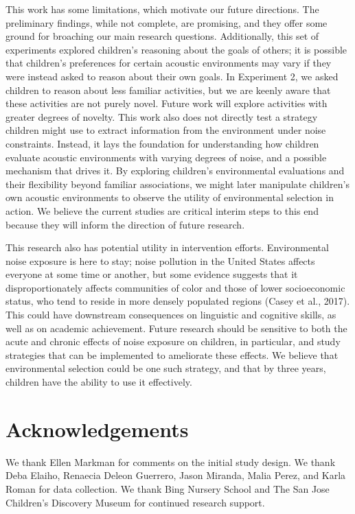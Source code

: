 \documentclass[10pt, letterpaper]{article}
\begin{document}
This work has some limitations, which motivate our future directions.
The preliminary findings, while not complete, are promising, and they
offer some ground for broaching our main research questions.
Additionally, this set of experiments explored children's reasoning
about the goals of others; it is possible that children's preferences
for certain acoustic environments may vary if they were instead asked to
reason about their own goals. In Experiment 2, we asked children to
reason about less familiar activities, but we are keenly aware that
these activities are not purely novel. Future work will explore
activities with greater degrees of novelty. This work also does not
directly test a strategy children might use to extract information from
the environment under noise constraints. Instead, it lays the foundation
for understanding how children evaluate acoustic environments with
varying degrees of noise, and a possible mechanism that drives it. By
exploring children's environmental evaluations and their flexibility
beyond familiar associations, we might later manipulate children's own
acoustic environments to observe the utility of environmental selection
in action. We believe the current studies are critical interim steps to
this end because they will inform the direction of future research.

This research also has potential utility in intervention efforts.
Environmental noise exposure is here to stay; noise pollution in the
United States affects everyone at some time or another, but some
evidence suggests that it disproportionately affects communities of
color and those of lower socioeconomic status, who tend to reside in
more densely populated regions (Casey et al., 2017). This could have
downstream consequences on linguistic and cognitive skills, as well as
on academic achievement. Future research should be sensitive to both the
acute and chronic effects of noise exposure on children, in particular,
and study strategies that can be implemented to ameliorate these
effects. We believe that environmental selection could be one such
strategy, and that by three years, children have the ability to use it
effectively.

\hypertarget{acknowledgements}{%
\section{Acknowledgements}\label{acknowledgements}}

We thank Ellen Markman for comments on the initial study design. We
thank Deba Elaiho, Renaecia Deleon Guerrero, Jason Miranda, Malia Perez,
and Karla Roman for data collection. We thank Bing Nursery School and
The San Jose Children's Discovery Museum for continued research support.
\end{document}
